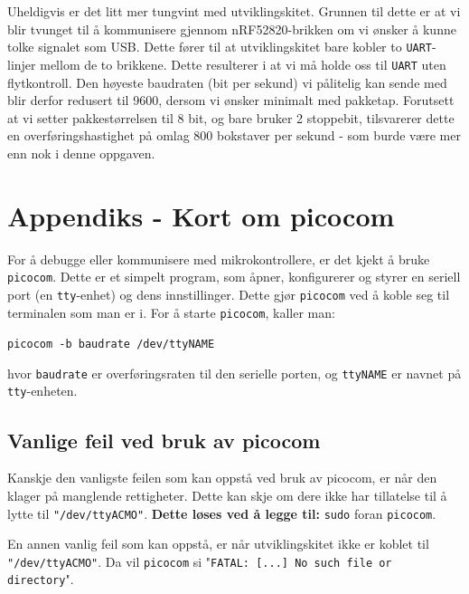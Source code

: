 Uheldigvis er det litt mer tungvint med utviklingskitet. Grunnen til dette er at vi blir tvunget til å kommunisere gjennom nRF52820-brikken om vi ønsker å kunne tolke signalet som USB. Dette fører til at utviklingskitet bare kobler to \verb|UART|-linjer mellom de to brikkene. Dette resulterer i at vi må holde oss til \verb|UART| uten flytkontroll. Den høyeste baudraten (bit per sekund) vi pålitelig kan sende med blir derfor redusert til 9600, dersom vi ønsker minimalt med pakketap. Forutsett at vi setter pakkestørrelsen til 8 bit, og bare bruker 2 stoppebit, tilsvarerer dette en overføringshastighet på omlag 800 bokstaver per sekund - som burde være mer enn nok i denne oppgaven. 


\section{Appendiks - Kort om picocom}\label{app:picocom}

For å debugge eller kommunisere med mikrokontrollere, er det kjekt å bruke \verb|picocom|. Dette er et simpelt program, som åpner, konfigurerer og styrer en seriell port (en \verb|tty|-enhet) og dens innstillinger. Dette gjør \verb|picocom| ved å koble seg til terminalen som man er i. For å starte \verb|picocom|, kaller man:

\verb|picocom -b baudrate /dev/ttyNAME|

hvor \verb|baudrate| er overføringsraten til den serielle porten, og \verb|ttyNAME| er navnet på \verb|tty|-enheten.

\subsection{Vanlige feil ved bruk av picocom}
Kanskje den vanligste feilen som kan oppstå ved bruk av picocom, er når den klager på manglende rettigheter. Dette kan skje om dere ikke har tillatelse til å lytte til \verb|"/dev/ttyACMO"|. \textbf{Dette løses ved å legge til:} \verb|sudo| foran \verb|picocom|.

En annen vanlig feil som kan oppstå, er når utviklingskitet ikke er koblet til \verb|"/dev/ttyACMO"|. Da vil \verb|picocom| si "\verb|FATAL: [...] No such file or directory|".

